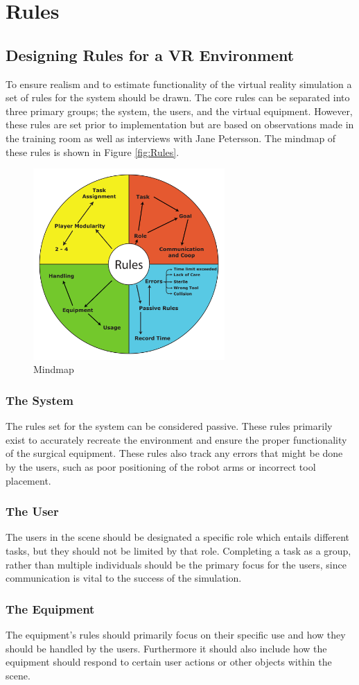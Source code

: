 \chapter*{Rules}
\section*{Designing Rules for a VR Environment}

To ensure realism and to estimate functionality of the virtual reality simulation a set of rules for the system should be drawn. The core rules can be separated into three primary groups; the system, the users, and the virtual equipment. However, these rules are set prior to implementation but are based on observations made in the training room as well as interviews with Jane Petersson. The mindmap of these rules is shown in Figure  \autoref{fig:Rules}.

\begin{figure}[H]
\centering
\includegraphics[width=0.65\textwidth]{WorksheetRules/brainstorm_rules}
\caption{Mindmap}
\label{fig:Rules}
\end{figure}

\subsection*{The System}
The rules set for the system can be considered passive. These rules primarily exist to accurately recreate the environment and ensure the proper functionality of the surgical equipment. These rules also track any errors that might be done by the users, such as poor positioning of the robot arms or incorrect tool placement.

\subsection*{The User}
The users in the scene should be designated a specific role which entails different tasks, but they should not be limited by that role. Completing a task as a group, rather than multiple individuals should be the primary focus for the users, since communication is vital to the success of the simulation.

\subsection*{The Equipment}
The equipment's rules should primarily focus on their specific use and how they should be handled by the users. Furthermore it should also include how the equipment should respond to certain user actions or other objects within the scene.
